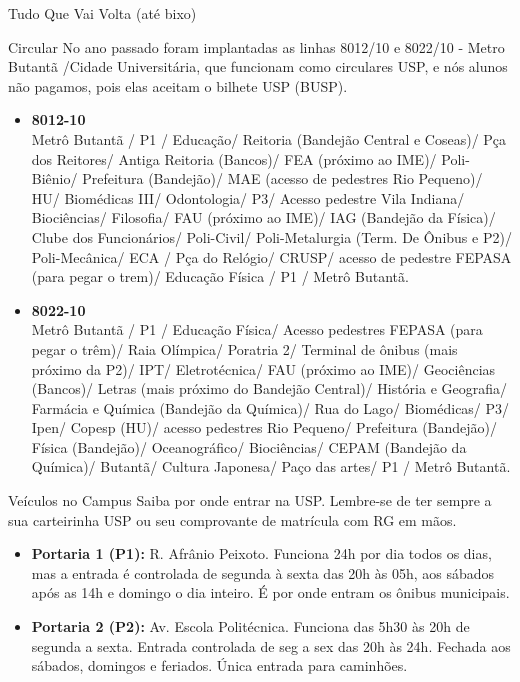 \begin{secao}{Tudo Que Vai Volta (até bixo)}
\begin{subsecao}{Circular}
No ano passado foram implantadas as linhas 8012/10 e 8022/10 - Metro Butantã /Cidade Universitária, que funcionam como circulares USP, e nós alunos não pagamos, pois elas aceitam o bilhete USP (BUSP).

\begin{itemize}
  \item {\bf 8012-10}\\
    Metrô Butantã / P1 / Educação/ Reitoria (Bandejão Central e
    Coseas)/ Pça dos Reitores/ Antiga Reitoria (Bancos)/ FEA (próximo ao IME)/
    Poli-Biênio/ Prefeitura (Bandejão)/ MAE (acesso de pedestres Rio Pequeno)/
    HU/ Biomédicas III/ Odontologia/ P3/ Acesso pedestre Vila Indiana/ 	  
    Biociências/ Filosofia/
    FAU (próximo ao IME)/ IAG (Bandejão da Física)/ Clube dos Funcionários/
    Poli-Civil/ Poli-Metalurgia (Term. De Ônibus e P2)/ Poli-Mecânica/ ECA / 
    Pça do Relógio/ CRUSP/ acesso de pedestre FEPASA (para pegar o trem)/ 
    Educação Física / P1 / Metrô Butantã.

  \item {\bf 8022-10}\\
    Metrô Butantã / P1 / Educação Física/ Acesso pedestres FEPASA (para
    pegar o trêm)/ Raia Olímpica/ Poratria 2/ Terminal de ônibus (mais próximo
    da P2)/ IPT/ Eletrotécnica/ FAU (próximo ao IME)/ Geociências (Bancos)/
    Letras (mais próximo do Bandejão Central)/ História e Geografia/ Farmácia e
    Química (Bandejão da Química)/ Rua do Lago/ Biomédicas/ P3/ Ipen/ Copesp
    (HU)/ acesso pedestres Rio Pequeno/
    Prefeitura (Bandejão)/ Física (Bandejão)/ Oceanográfico/ Biociências/ CEPAM
    (Bandejão da Química)/ Butantã/ Cultura Japonesa/ Paço das artes/
    P1 / Metrô Butantã.
    
\end{itemize}
\end{subsecao}

\begin{subsecao}{Veículos no Campus}
Saiba por onde entrar na USP. Lembre-se de ter sempre a sua carteirinha USP ou
seu comprovante de matrícula com RG em mãos. 
\begin{itemize}
  \item {\bf Portaria 1 (P1):} R. Afrânio Peixoto. Funciona 24h por dia todos os
    dias, mas a entrada é controlada de segunda à sexta das 20h às 05h, aos sábados
    após as 14h e domingo o dia inteiro. É por onde entram os ônibus municipais. 
    
  \item {\bf Portaria 2 (P2):} Av. Escola Politécnica. Funciona das 5h30 às 20h
    de segunda a sexta. Entrada controlada de seg a sex das 20h às 24h. Fechada
    aos sábados, domingos e feriados. Única entrada para caminhões. 
    

\end{itemize}
\end{subsecao}
\end{secao}

